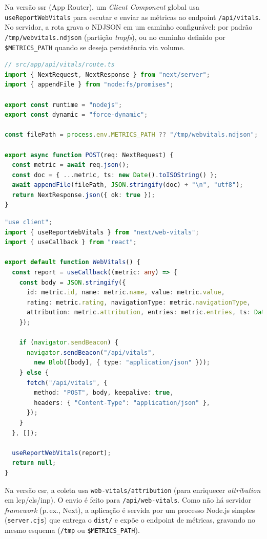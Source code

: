 Na versão \acrshort{ssr} (App Router), um \textit{Client Component} global usa \texttt{useReportWebVitals} para escutar e enviar as métricas ao endpoint \texttt{/api/vitals}. No servidor, a rota grava o NDJSON em um caminho configurável: por padrão \texttt{/tmp/webvitals.ndjson} (partição \textit{tmpfs}), ou no caminho definido por \texttt{\$METRICS\_PATH} quando se deseja persistência via volume.

\begin{lstlisting}[language=TypeScript,caption={Endpoint de métricas no SSR/Next.js (visão de servidor)}]
// src/app/api/vitals/route.ts
import { NextRequest, NextResponse } from "next/server";
import { appendFile } from "node:fs/promises";

export const runtime = "nodejs";
export const dynamic = "force-dynamic";

const filePath = process.env.METRICS_PATH ?? "/tmp/webvitals.ndjson";

export async function POST(req: NextRequest) {
  const metric = await req.json();
  const doc = { ...metric, ts: new Date().toISOString() };
  await appendFile(filePath, JSON.stringify(doc) + "\n", "utf8");
  return NextResponse.json({ ok: true });
}
\end{lstlisting}

\begin{lstlisting}[language=TypeScript,caption={Envio de métricas no cliente (SSR/Next.js)}]
"use client";
import { useReportWebVitals } from "next/web-vitals";
import { useCallback } from "react";

export default function WebVitals() {
  const report = useCallback((metric: any) => {
    const body = JSON.stringify({
      id: metric.id, name: metric.name, value: metric.value,
      rating: metric.rating, navigationType: metric.navigationType,
      attribution: metric.attribution, entries: metric.entries, ts: Date.now(),
    });

    if (navigator.sendBeacon) {
      navigator.sendBeacon("/api/vitals",
        new Blob([body], { type: "application/json" }));
    } else {
      fetch("/api/vitals", {
        method: "POST", body, keepalive: true,
        headers: { "Content-Type": "application/json" },
      });
    }
  }, []);

  useReportWebVitals(report);
  return null;
}
\end{lstlisting}

Na versão \acrshort{csr}, a coleta usa \texttt{web-vitals/attribution} (para enriquecer \textit{attribution} em \acrshort{lcp}/\acrshort{cls}/\acrshort{inp}). O envio é feito para \texttt{/api/web-vitals}. Como não há servidor \textit{framework} (p.\,ex., Next), a aplicação é servida por um processo Node.js simples (\texttt{server.cjs}) que entrega o \texttt{dist/} e expõe o endpoint de métricas, gravando no mesmo esquema (\texttt{/tmp} ou \texttt{\$METRICS\_PATH}).

